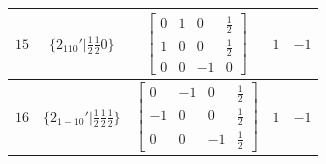 \documentclass[fleqn,8pt]{jsarticle}
\begin{document}
\begin{longtable}{ccccc}
$ 15 $ & $ \{2{}_{110}{}'|\frac{1}{2} \frac{1}{2} 0\} $ & $ \begin{bmatrix} 0 & 1 & 0 & \frac{1}{2} \\ 1 & 0 & 0 & \frac{1}{2} \\ 0 & 0 & -1 & 0 \end{bmatrix} $ & $ 1 $ & $ -1 $ \\ \hline
$ 16 $ & $ \{2{}_{1-10}{}'|\frac{1}{2} \frac{1}{2} \frac{1}{2}\} $ & $ \begin{bmatrix} 0 & -1 & 0 & \frac{1}{2} \\ -1 & 0 & 0 & \frac{1}{2} \\ 0 & 0 & -1 & \frac{1}{2} \end{bmatrix} $ & $ 1 $ & $ -1 $ \\
\end{longtable}
\end{document}
